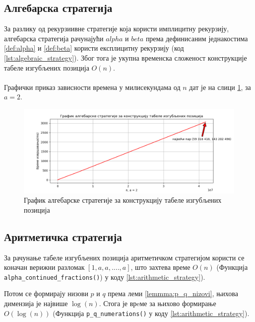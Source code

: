 \documentclass[a4paper]{article}
\begin{document}
\subsection{Алгебарска стратегија}

За разлику од рекурзиивне стратегије која користи имплицитну рекурзију, алгебарска стратегија рачунајући $ alpha $ и $ beta $ према дефинисаним једнакостима \eqref{def:alpha} и \eqref{def:beta} користи експлицитну рекурзију (код \ref{lst:algebraic_strategy}). Због тога је укупна временска сложеност конструкције табеле изгубљених позиција $ O(n) $.\\



\leavevmode\\
Графички приказ зависности времена у милисекундама од $ n $ дат је на слици \ref{fig:algebraic}, за $ a = 2 $.

\begin{figure}[H]
	\begin{center}
		\includegraphics[width=\textwidth]{algebraic.png}
	\end{center}
	\caption{График алгебарске стратегије за конструкцију табеле изгубљених позиција}
	\label{fig:algebraic}
\end{figure}

\subsection{Аритметичка стратегија}

За рачунање табеле изгубљених позиција аритметичком стратегијом користи се коначан верижни разломак $ [1, a, a, ...., a] $, што захтева време $ O(n) $ (Функција \verb|alpha_continued_fractions()|) у коду \ref{lst:arithmetic_strategy}).

Потом се формирају низови $ p $ и $ q $ према леми \ref{lemmma:p_q_nizovi}, њихова димензија је највише $ \log(n) $. Стога је врeме за њихово формирање $ O(\log(n)) $ (Функција \verb|p_q_numerations()| у коду \ref{lst:arithmetic_strategy}).
\end{document}
